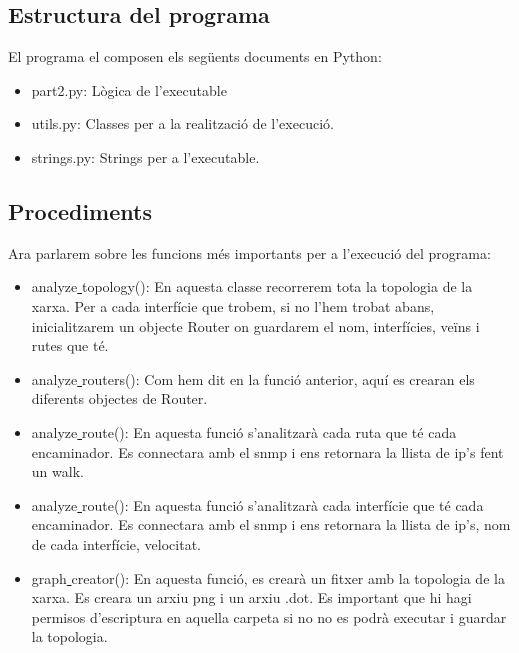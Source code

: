 \documentclass[10pt]{article}
\begin{document}
\subsection{Estructura del programa}
El programa el composen els següents documents en Python:
\begin{itemize}
	\item part2.py: Lògica de l'executable
	\item utils.py: Classes per a la realització de l'execució.
	\item strings.py: Strings per a l'executable.
\end{itemize}
\subsection{Procediments}
Ara parlarem sobre les funcions més importants per a l'execució del programa:
\begin{itemize}
\item analyze\underline{ }topology(): En aquesta classe recorrerem tota la topologia de la xarxa. Per a cada interfície que trobem, si no l'hem trobat abans, inicialitzarem un objecte Router on guardarem el nom, interfícies, veïns i rutes que té.
\item analyze\underline{ }routers(): Com hem dit en la funció anterior, aquí es crearan els diferents objectes de Router.
\item analyze\underline{ }route(): En aquesta funció s'analitzarà cada ruta que té cada encaminador. Es connectara amb el snmp i ens retornara la llista de ip's fent un walk.
\item analyze\underline{ }route(): En aquesta funció s'analitzarà cada interfície que té cada encaminador. Es connectara amb el snmp i ens retornara la llista de ip's, nom de cada interfície, velocitat.
\item graph\underline{ }creator(): En aquesta funció, es crearà un fitxer amb la topologia de la xarxa. Es creara un arxiu png i un arxiu .dot. Es important que hi hagi permisos d'escriptura en aquella carpeta si no no es podrà executar i guardar la topologia.
\end{itemize}
\end{document}
